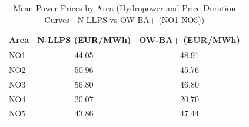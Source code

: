 \begin{table}[htbp]
\centering
\caption{Mean Power Prices by Area (Hydropower and Price Duration Curves - N-LLPS vs OW-BA+ (NO1-NO5))}
\label{tab:mean_prices_NO_areas_N_LLPS_OW_BA_plus}
\begin{tabular}{lcc}
\hline
Area & N-LLPS (EUR/MWh) & OW-BA+ (EUR/MWh) \\
\hline
NO1 & 44.05 & 48.91 \\
NO2 & 50.96 & 45.76 \\
NO3 & 56.80 & 46.80 \\
NO4 & 20.07 & 20.70 \\
NO5 & 43.86 & 47.44 \\
\hline
\end{tabular}
\end{table}